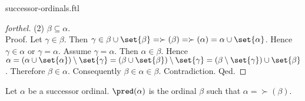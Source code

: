 \documentclass{naproche-library}
\begin{document}
\begin{smodule}{successor-ordinals.ftl}
\begin{proof}[forthel]
    (2) $\beta \subseteq \alpha$. \\
    Proof.
      Let $\gamma \in \beta$.
      Then $\gamma \in \beta \cup \set{\beta}
        = \succ(\beta)
        = \succ(\alpha)
        = \alpha \cup \set{\alpha}$.
      Hence $\gamma \in \alpha$ or $\gamma = \alpha$.
      Assume $\gamma = \alpha$.
      Then $\alpha \in \beta$.
      Hence $\alpha
        = (\alpha \cup \set{\alpha}) \setminus \set{\gamma}
        = (\beta \cup \set{\beta}) \setminus \set{\gamma}
        = (\beta \setminus \set{\gamma}) \cup \set{\beta}$.
      Therefore $\beta \in \alpha$.
      Consequently $\beta \in \alpha \in \beta$.
      Contradiction.
    Qed.
  \end{proof}

  \begin{definition}[forthel,id=SET_THEORY_02_735071524880384]
    Let $\alpha$ be a successor ordinal.
    $\pred(\alpha)$ is the ordinal $\beta$ such that $\alpha = \succ(\beta)$.
  \end{definition}
\end{smodule}
\end{document}

